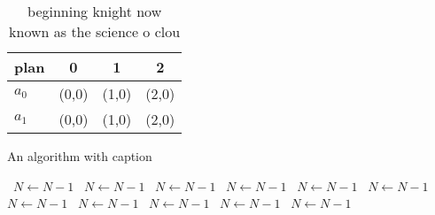 \documentclass[a4paper]{article}
\begin{document}
\begin{table}
\begin{adjustbox}{width=0.6\columnwidth}
\begin{tabular}{|l|l|l|l|}
\hline
\textbf{plan} & \multicolumn{1}{c|}{\textbf{0}} & \multicolumn{1}{c|}{\textbf{1}} & \multicolumn{1}{c|}{\textbf{2}} \\ \hline
\textbf{$a_0$}  & (0,0) & (1,0) & (2,0) \\ \hline
\textbf{$a_1$}  & (0,0) & (1,0) & (2,0) \\ \hline
\end{tabular}
\end{adjustbox}
\caption{ beginning knight now known as the science o clou
}
\end{table}

\begin{algorithm}
\caption{An algorithm with caption}
\begin{algorithmic}
\    \State $N \gets N - 1$
\    \State $N \gets N - 1$
\    \State $N \gets N - 1$
\    \State $N \gets N - 1$
\    \State $N \gets N - 1$
\    \State $N \gets N - 1$
\    \State $N \gets N - 1$
\    \State $N \gets N - 1$
\    \State $N \gets N - 1$
\    \State $N \gets N - 1$
\    \State $N \gets N - 1$
\EndWhile
\end{algorithmic}
\end{algorithm}
\end{document}
